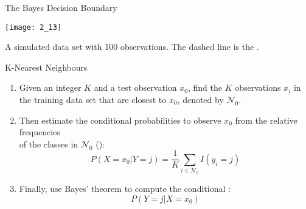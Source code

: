 \documentclass[mathserif, aspectratio=169]{beamer}
\begin{document}
\begin{frame}{The Bayes Decision Boundary}
	\vspace{-2mm}
	\begin{center}
		\texttt{[image: 2\_13]}

		A simulated data set with 100 observations. The dashed line is the .
	\end{center}
\end{frame}

\begin{frame}{K-Nearest Neighbours}
	\begin{enumerate}
		\item Given an integer $K$ and a test observation $x_0$, find the $K$ observations $x_i$
			in the training data set that are closest to $x_0$, denoted by $\mathcal{N}_0$.
		\item Then estimate the conditional probabilities to observe $x_0$ from the relative frequencies\\
			of the classes in $\mathcal{N}_0$ ():
			\[ P(X=x_0\vert Y=j) = \frac{1}{K}\sum_{i \in\mathcal{N}_0} I(y_i = j) \]
		\item Finally, use Bayes' theorem to compute the conditional :
			\[P(Y=j\vert X=x_0)\]
	\end{enumerate}
\end{frame}
\end{document}
